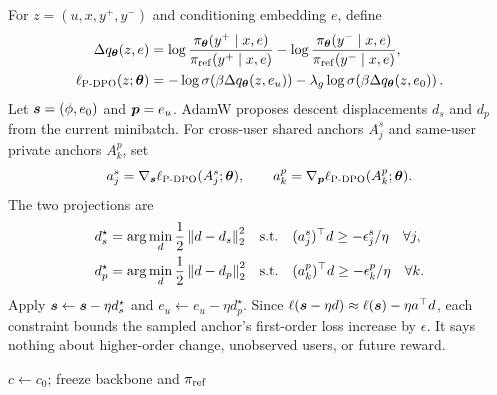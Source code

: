 For $z=(u,x,y^+,y^-)$ and conditioning embedding $e$, define
\begin{align}
  \Delta q_{\bm{\theta}}(z,e)
  &=
  \log\frac{\pi_{\bm{\theta}}(y^+\mid x,e)}
            {\pi_{\mathrm{ref}}(y^+\mid x,e)}
  -
  \log\frac{\pi_{\bm{\theta}}(y^-\mid x,e)}
            {\pi_{\mathrm{ref}}(y^-\mid x,e)}, \\
  \ell_{\textsc{P-DPO}}(z;\bm{\theta})
  &=
  -\log\sigma\!\left(\beta\Delta q_{\bm{\theta}}(z,e_u)\right)
  -\lambda_g\log\sigma\!\left(\beta\Delta q_{\bm{\theta}}(z,e_0)\right).
  \label{eq:ownership-pdpo}
\end{align}
Let $\bm{s}=(\phi,e_0)$ and $\bm{p}=e_u$.  AdamW proposes descent
displacements $d_s$ and $d_p$ from the current minibatch.  For cross-user
shared anchors $A^s_j$ and same-user private anchors $A^p_k$, set
\begin{equation}
  a^s_j=\nabla_{\bm{s}}\ell_{\textsc{P-DPO}}(A^s_j;\bm{\theta}),
  \qquad
  a^p_k=\nabla_{\bm{p}}\ell_{\textsc{P-DPO}}(A^p_k;\bm{\theta}).
\end{equation}
The two projections are
\begin{align}
  d_s^\star
  &=
  \arg\min_d \frac{1}{2}\left\lVert d-d_s \right\rVert_2^2
  &&\text{s.t.}\quad
  (a^s_j)^\top d\ge -\epsilon^s_j/\eta
  \quad \forall j, \label{eq:shared-cone}\\
  d_p^\star
  &=
  \arg\min_d \frac{1}{2}\left\lVert d-d_p \right\rVert_2^2
  &&\text{s.t.}\quad
  (a^p_k)^\top d\ge -\epsilon^p_k/\eta
  \quad \forall k. \label{eq:private-cone}
\end{align}
Apply $\bm{s}\leftarrow\bm{s}-\eta d_s^\star$ and
$e_u\leftarrow e_u-\eta d_p^\star$.  Since
$\ell(\bm{s}-\eta d)\approx\ell(\bm{s})-\eta a^\top d$, each constraint
bounds the sampled anchor's first-order loss increase by $\epsilon$.  It says
nothing about higher-order change, unobserved users, or future reward.

\begin{algorithm}[t]
  \caption{Ownership-Cone P-DPO}
  \label{alg:ownership-cone}
  $c\leftarrow c_0$; freeze backbone and $\pi_{\mathrm{ref}}$\;
\end{algorithm}


